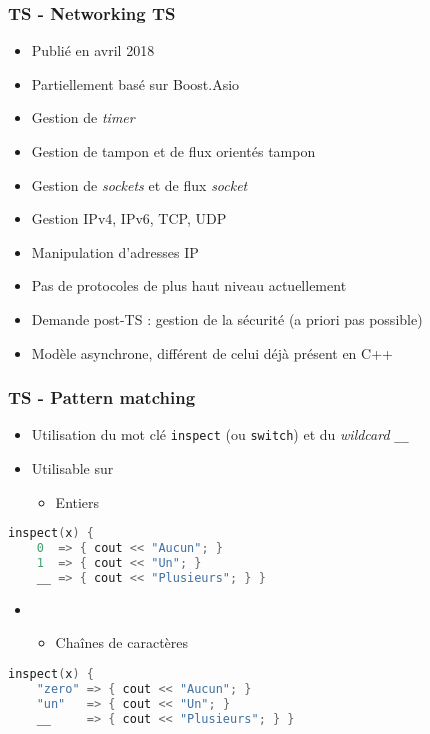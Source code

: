 \documentclass[C++.tex]{subfiles}
\begin{document}
\begin{frame}[fragile]
	\frametitle{TS - Networking TS}
	\begin{itemize}
		\item Publié en avril 2018
		\item Partiellement basé sur Boost.Asio
		\item Gestion de \textit{timer}
		\item Gestion de tampon et de flux orientés tampon
		\item Gestion de \textit{sockets} et de flux \textit{socket}
		\item Gestion IPv4, IPv6, TCP, UDP
		\item Manipulation d'adresses IP
		\item Pas de protocoles de plus haut niveau actuellement
		\item Demande post-TS : gestion de la sécurité (a priori pas possible)
		\item Modèle asynchrone, différent de celui déjà présent en C++
	\end{itemize}
\end{frame}

\begin{frame}[fragile]
	\frametitle{TS - Pattern matching}
	\begin{itemize}
		\item Utilisation du mot clé \lstinline|inspect| (ou \lstinline|switch|) et du \textit{wildcard} \lstinline|__|
		\item Utilisable sur
		\begin{itemize}
			\item Entiers

		\end{itemize}
	\end{itemize}

	\begin{lstlisting}[language=C++]
inspect(x) {
	0  => { cout << "Aucun"; }
	1  => { cout << "Un"; }
	__ => { cout << "Plusieurs"; } }\end{lstlisting}

	\begin{itemize}
		\item[] 
		\begin{itemize}
			\item Chaînes de caractères
		\end{itemize}
	\end{itemize}

	\begin{lstlisting}[language=C++]
inspect(x) {
	"zero" => { cout << "Aucun"; }
	"un"   => { cout << "Un"; }
	__     => { cout << "Plusieurs"; } }\end{lstlisting}
\end{frame}
\end{document}
